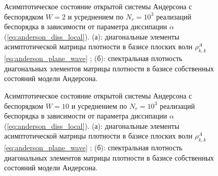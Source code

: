\begin{figure}[h]
	\legend{}
	\caption[Асимптотическое состояние открытой системы Андерсона для слабого беспорядка в зависимости от параметра диссипации]
	{
		Асимптотическое состояние открытой системы Андерсона с беспорядком \(W=2\) и усреднением по \(N_r=10^3\) реализаций беспорядка в зависимости от параметра диссипации \(\alpha\) (\cref{eq:anderson_diss_local}). (а): диагональные элементы асимптотической матрицы плотности в базисе плоских волн \(\rho^A_{k,k}\) \cref{eq:anderson_plane_wave} ; (б): спектральная плотность диагональных элементов матрицы плотности в базисе собственных состояний модели Андерсона.
	}
	\label{fig:anderson_rho_kk_in_foutier_1}
\end{figure}
\begin{figure}[h]
	\legend{}
	\caption[Асимптотическое состояние открытой системы Андерсона для сильного беспорядка в зависимости от параметра диссипации]
	{
		Асимптотическое состояние открытой системы Андерсона с беспорядком \(W=10\) и усреднением по \(N_r=10^3\) реализаций беспорядка в зависимости от параметра диссипации \(\alpha\) (\cref{eq:anderson_diss_local}). (а): диагональные элементы асимптотической матрицы плотности в базисе плоских волн \(\rho^A_{k,k}\) \cref{eq:anderson_plane_wave} ; (б): спектральная плотность диагональных элементов матрицы плотности в базисе собственных состояний модели Андерсона.
	}
	\label{fig:anderson_rho_kk_in_foutier_2}
\end{figure}

